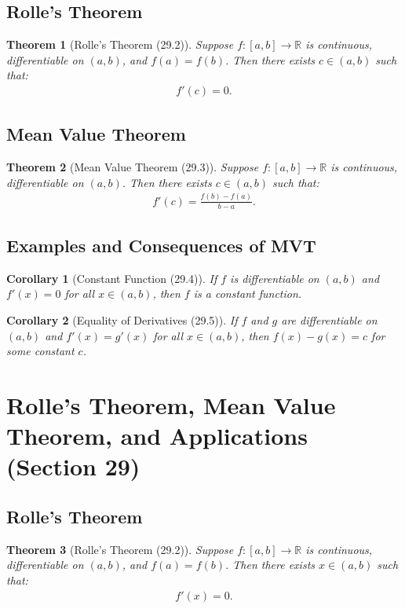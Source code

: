 \documentclass[9pt]{article}
\theoremstyle{definition}
\theoremstyle{plain}
\newtheorem{theorem}{Theorem}
\newtheorem{corollary}{Corollary}
\begin{document}
\subsection*{Rolle’s Theorem}
\begin{theorem}[Rolle’s Theorem (29.2)]
Suppose $ f : [a, b] \to \mathbb{R} $ is continuous, differentiable on $ (a, b) $, and $ f(a) = f(b) $. Then there exists $ c \in (a, b) $ such that:
\begin{align}
f'(c) = 0.
\end{align}
\end{theorem}

\subsection*{Mean Value Theorem}
\begin{theorem}[Mean Value Theorem (29.3)]
Suppose $ f : [a, b] \to \mathbb{R} $ is continuous, differentiable on $ (a, b) $. Then there exists $ c \in (a, b) $ such that:
\begin{align}
f'(c) = \frac{f(b) - f(a)}{b - a}.
\end{align}
\end{theorem}

\subsection*{Examples and Consequences of MVT}
\begin{corollary}[Constant Function (29.4)]
If $ f $ is differentiable on $ (a, b) $ and $ f'(x) = 0 $ for all $ x \in (a, b) $, then $ f $ is a constant function.
\end{corollary}

\begin{corollary}[Equality of Derivatives (29.5)]
If $ f $ and $ g $ are differentiable on $ (a, b) $ and $ f'(x) = g'(x) $ for all $ x \in (a, b) $, then $ f(x) - g(x) = c $ for some constant $ c $.
\end{corollary}
\section*{Rolle’s Theorem, Mean Value Theorem, and Applications (Section 29)}

\subsection*{Rolle’s Theorem}
\begin{theorem}[Rolle’s Theorem (29.2)]
Suppose $ f : [a, b] \to \mathbb{R} $ is continuous, differentiable on $ (a, b) $, and $ f(a) = f(b) $. Then there exists $ x \in (a, b) $ such that:
\begin{align}
f'(x) = 0.
\end{align}
\end{theorem}
\end{document}
